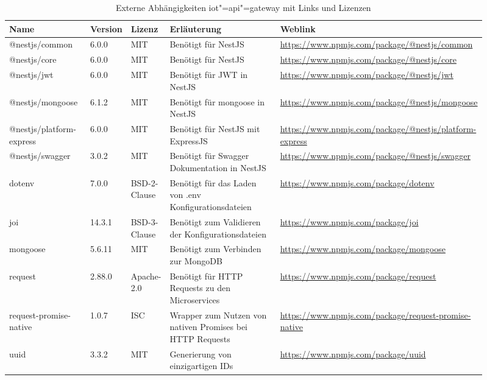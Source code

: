 \begin{landscape}
\begin{table}[htb]
	\caption{Externe Abhängigkeiten iot"=api"=gateway mit Links und Lizenzen}
	\begin{tabular}{|p{0.18\linewidth}|p{0.06\linewidth}|p{0.06\linewidth}|p{0.28\linewidth}|p{0.33\linewidth}|}
		\hline
		Name & Version & Lizenz & Erläuterung & Weblink \\ \hline
		@nestjs/common & 6.0.0 & MIT & Benötigt für NestJS & \small\url{https://www.npmjs.com/package/@nestjs/common} \\ \hline
		@nestjs/core & 6.0.0 & MIT & Benötigt für NestJS & \small\url{https://www.npmjs.com/package/@nestjs/core} \\ \hline
		@nestjs/jwt & 6.0.0 & MIT & Benötigt für JWT in NestJS & \small\url{https://www.npmjs.com/package/@nestjs/jwt} \\ \hline
		@nestjs/mongoose & 6.1.2 & MIT & Benötigt für mongoose in NestJS & \small\url{https://www.npmjs.com/package/@nestjs/mongoose} \\ \hline
		@nestjs/platform-express & 6.0.0 & MIT & Benötigt für NestJS mit ExpressJS & \small\url{https://www.npmjs.com/package/@nestjs/platform-express} \\ \hline
		@nestjs/swagger & 3.0.2 & MIT & Benötigt für Swagger Dokumentation in NestJS & \small\url{https://www.npmjs.com/package/@nestjs/swagger} \\ \hline
		dotenv & 7.0.0 & BSD-2-Clause & Benötigt für das Laden von .env Konfigurationsdateien & \small\url{https://www.npmjs.com/package/dotenv} \\ \hline
		joi & 14.3.1 & BSD-3-Clause & Benötigt zum Validieren der Konfigurationsdateien & \small\url{https://www.npmjs.com/package/joi} \\ \hline
		mongoose & 5.6.11 & MIT & Benötigt zum Verbinden zur MongoDB & \small\url{https://www.npmjs.com/package/mongoose} \\ \hline
		request & 2.88.0 & Apache-2.0 & Benötigt für HTTP Requests zu den Microservices & \small\url{https://www.npmjs.com/package/request} \\ \hline
		request-promise-native & 1.0.7 & ISC & Wrapper zum Nutzen von nativen Promises bei HTTP Requests & \small\url{https://www.npmjs.com/package/request-promise-native} \\ \hline
		uuid & 3.3.2 & MIT & Generierung von einzigartigen IDs & \small\url{https://www.npmjs.com/package/uuid} \\ \hline
	\end{tabular}
	\label{tbl:dependenciesApiGateway}
\end{table}


\end{landscape}
